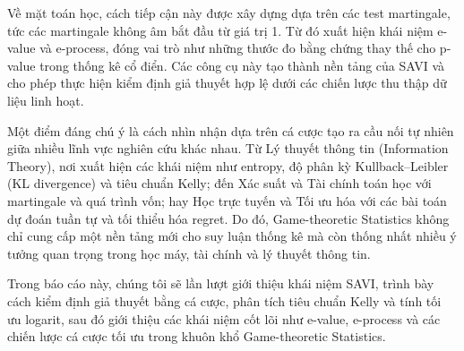 Về mặt toán học, cách tiếp cận này được xây dựng dựa trên các
test martingale, tức các martingale không âm bắt đầu từ giá
trị 1. Từ đó xuất hiện khái niệm e-value và
e-process, đóng vai trò như những thước đo bằng chứng thay
thế cho p-value trong thống kê cổ điển. Các công cụ này tạo thành nền tảng của
SAVI và cho phép thực hiện kiểm định giả thuyết hợp lệ dưới các chiến lược thu
thập dữ liệu linh hoạt.

Một điểm đáng chú ý là cách nhìn nhận dựa trên cá cược tạo ra cầu nối tự nhiên
giữa nhiều lĩnh vực nghiên cứu khác nhau. Từ Lý thuyết thông tin
(Information Theory), nơi xuất hiện các khái niệm như
entropy, độ phân kỳ Kullback--Leibler (KL divergence) và
tiêu chuẩn Kelly; đến Xác suất và Tài chính toán học với
martingale và quá trình vốn; hay Học trực tuyến và
Tối ưu hóa với các bài toán dự đoán tuần tự và tối thiểu hóa regret. Do đó,
Game-theoretic Statistics không chỉ cung cấp một nền tảng mới
cho suy luận thống kê mà còn thống nhất nhiều ý tưởng quan trọng trong học máy,
tài chính và lý thuyết thông tin.

Trong báo cáo này, chúng tôi sẽ lần lượt giới thiệu khái niệm SAVI,
trình bày cách kiểm định giả thuyết bằng cá cược, phân tích
tiêu chuẩn Kelly và tính tối ưu logarit, sau đó giới thiệu
các khái niệm cốt lõi như e-value, e-process và các
chiến lược cá cược tối ưu trong khuôn khổ Game-theoretic
Statistics.
